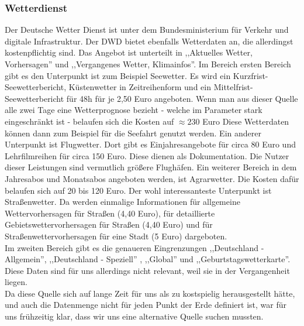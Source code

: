 \documentclass[a4paper,oneside,12pt,titlepage]{article}
\begin{document}
\subsubsection*{Wetterdienst} %
Der Deutsche Wetter Dienst ist unter dem Bundesministerium für Verkehr und digitale Infrastruktur. \cite{bmvi}
Der DWD bietet ebenfalls Wetterdaten an, die allerdingst kostenpflichtig sind. Das Angebot ist unterteilt in ,,Aktuelles Wetter, Vorhersagen'' und ,,Vergangenes Wetter, Klimainfos''. Im Bereich ersten Bereich gibt es den Unterpunkt ist zum Beispiel Seewetter. Es wird ein Kurzfrist-Seewetterbericht, Küstenwetter in Zeitreihenform und ein Mittelfrist-Seewetterbericht für 48h für je 2,50 Euro angeboten. Wenn man aus dieser Quelle alle zwei Tage eine Wetterprognose bezieht - welche im Parameter stark eingeschränkt ist - belaufen sich die Kosten auf $\approx 230$ Euro Diese Wetterdaten können dann zum Beispiel für die Seefahrt genutzt werden. Ein anderer Unterpunkt ist Flugwetter. Dort gibt es Einjahresangebote für circa 80 Euro und Lehrfilmreihen für circa 150 Euro. Diese dienen als Dokumentation. Die Nutzer dieser Leistungen sind vermutlich größere Flughäfen. Ein weiterer Bereich in dem Jahresabos und Monatsabos angeboten werden, ist Agrarwetter. Die Kosten dafür belaufen sich auf 20 bis 120 Euro. Der wohl interessanteste Unterpunkt ist Straßenwetter. Da werden einmalige Informationen für allgemeine Wettervorhersagen für Straßen (4,40 Euro), für detaillierte Gebietswettervorhersagen für Straßen (4,40 Euro) und für Straßenwettervorhersagen für eine Stadt (5 Euro) dargeboten. \\
Im zweiten Bereich gibt es die genaueren Eingrenzungen ,,Deutschland - Allgemein'', ,,Deutschland - Speziell'' , ,,Global'' und ,,Geburtstagswetterkarte''.
\cite{dwd-shop}
Diese Daten sind für uns allerdings nicht relevant, weil sie in der Vergangenheit liegen. \\
Da diese Quelle sich auf lange Zeit für uns als zu kostspielig herausgestellt hätte, und auch die Datenmenge nicht für jeden Punkt der Erde definiert ist, war für uns frühzeitig klar, dass wir uns eine alternative Quelle suchen mussten.
\end{document}
